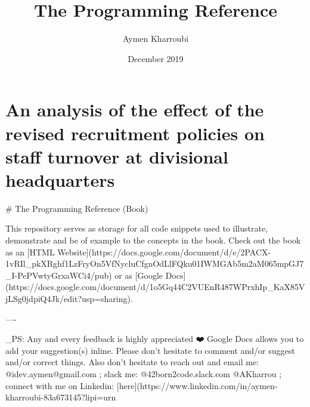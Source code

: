 \documentclass[ 11pt, twoside, a4paper ]{book}
\begin{document}
\title  { The Programming Reference }
\author { Aymen Kharroubi }
\date   { December 2019 }
\maketitle
\newpage


\section[Effect on staff turnover]{An analysis of the
effect of the revised recruitment policies on staff
turnover at divisional headquarters}

# The Programming Reference (Book)

This repository serves as storage for all code snippets used to illustrate, demonstrate and be of example to the concepts in the book. Check out the book as an [HTML Website](https://docs.google.com/document/d/e/2PACX-1vRIl_pkXRghf1LzFryOn5VfNycluCfgnOdLlFQku01IWMGAb5m2aM065mpGJ7_I-PePVwtyGrxaWCi4/pub) or as [Google Docs](https://docs.google.com/document/d/1o5Gq44C2VUEnR487WPrxhIp_KaX85VjLSg0jdpiQ4Jk/edit?usp=sharing).

----

_PS: Any and every feedback is highly appreciated ❤️ Google Docs allows you to add your suggestion(s) inline. Please don't hesitate to comment and/or suggest and/or correct things. Also don't hesitate to reach out and email me: @idev.aymen@gmail.com ; slack me: @42born2code.slack.com @AKharrou ; connect with me on Linkedin: [here](https://www.linkedin.com/in/aymen-kharroubi-83a673145?lipi=urn%
\end{document}
